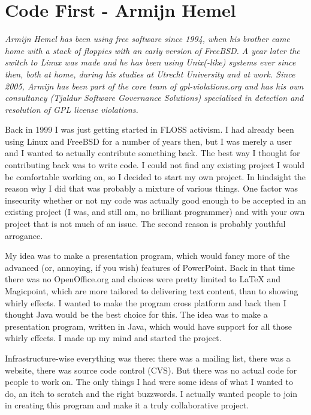 \chapter{Code First - Armijn Hemel}

\textit{Armijn Hemel has been using free software since 1994, when his brother
came home with a stack of floppies with an early version of FreeBSD. A year
later the switch to Linux was made and he has been using Unix(-like) systems
ever since then, both at home, during his studies at Utrecht University and at
work.
Since 2005, Armijn has been part of the core team of gpl-violations.org and has his own consultancy (Tjaldur Software Governance Solutions) specialized in detection and resolution of GPL license violations.}

Back in 1999 I was just getting started in FLOSS activism. I had already been
using Linux and FreeBSD for a number of years then, but I was merely a user and
I wanted to actually contribute something back. The best way I thought for
contributing back was to write code. I could not find any existing project I
would be comfortable working on, so I decided to start my own project. In
hindsight the reason why I did that was probably a mixture of various things.
One factor was insecurity whether or not my code was actually good enough to be
accepted in an existing project (I was, and still am, no brilliant programmer)
and with your own project that is not much of an issue. The second reason is
probably youthful arrogance.

My idea was to make a presentation program, which would fancy more of the
advanced (or, annoying, if you wish) features of PowerPoint. Back in that time
there was no OpenOffice.org and choices were pretty limited to LaTeX and
Magicpoint, which are more tailored to delivering text content, than to showing
whirly effects. I wanted to make the program cross platform and back then I
thought Java would be the best choice for this. The idea was to make a
presentation program, written in Java, which would have support for all those
whirly effects. I made up my mind and started the project.

Infrastructure-wise everything was there: there was a mailing list, there was a
website, there was source code control (CVS). But there was no actual code for
people to work on. The only things I had were some ideas of what I wanted to do,
an itch to scratch and the right buzzwords. I actually wanted people to join in
creating this program and make it a truly collaborative project.

